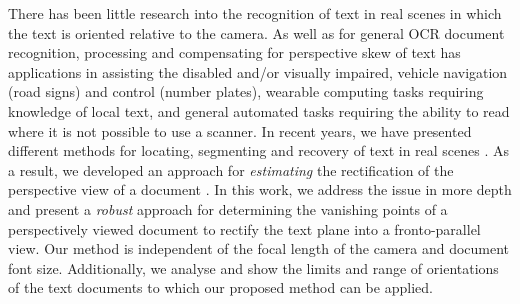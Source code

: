 \documentclass{elsart}   %
\begin{document}
There has been little research into the recognition of text in real scenes in
which the text is oriented relative to the camera.  As well as for general OCR
document recognition, processing and compensating for perspective skew of text
has applications in assisting the disabled and/or visually impaired, vehicle
navigation (road signs) and control (number plates), wearable computing tasks
requiring knowledge of local text, and general automated tasks requiring the
ability to read where it is not possible to use a scanner. In recent years, we
have presented different methods for locating, segmenting and recovery of 
text in real
scenes \cite{joey1,ClarkICPR2000,2001-clark,justin,clark-ijdar-2001}. As a
result, we developed an approach for {\em estimating} the rectification of the
perspective view of a document \cite{2001-clark,clark-ijdar-2001}. In this work,
we address the issue in more depth and present a {\em robust} approach for
determining the vanishing points of a perspectively viewed document to rectify
the text plane into a fronto-parallel view. Our method is independent of the focal
length of the camera and document font size. Additionally, we analyse and show
the limits and range of orientations of the text documents to which our proposed
method can be applied.


\end{document}

